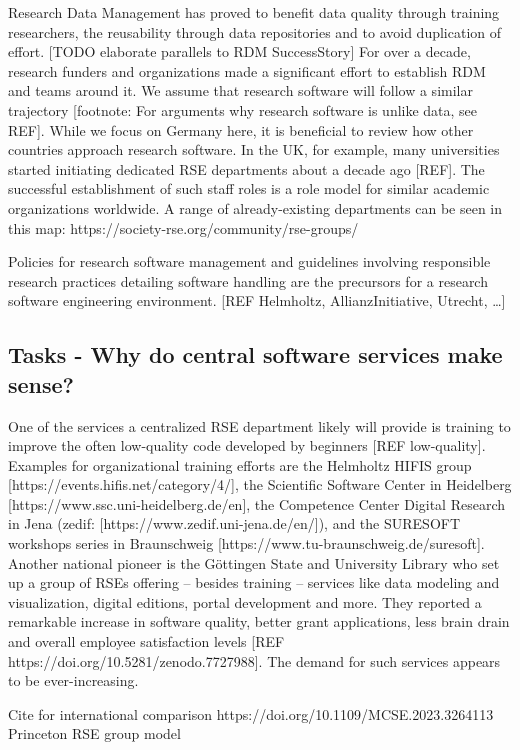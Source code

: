 \documentclass{article}
\begin{document}
Research Data Management has proved to benefit data quality through training researchers, the reusability through data repositories and to avoid duplication of effort.
[TODO elaborate parallels to RDM SuccessStory] For over a decade, research funders and organizations made a significant effort to establish RDM and teams around it.
We assume that research software will follow a similar trajectory [footnote: For arguments why research software is unlike data, see REF].
While we focus on Germany here, it is beneficial to review how other countries approach research software.
In the UK, for example, many universities started initiating dedicated RSE departments about a decade ago [REF].
The successful establishment of such staff roles is a role model for similar academic organizations worldwide.
A range of already-existing departments can be seen in this map: https://society-rse.org/community/rse-groups/ 

Policies for research software management and guidelines involving responsible research practices detailing software handling are the precursors for a research software engineering environment. [REF Helmholtz, AllianzInitiative, Utrecht, …]

\subsection{Tasks - Why do central software services make sense?}

One of the services a centralized RSE department likely will provide is training to improve the often low-quality code developed by beginners [REF low-quality].
Examples for organizational training efforts are the Helmholtz HIFIS group [https://events.hifis.net/category/4/], the Scientific Software Center in Heidelberg [https://www.ssc.uni-heidelberg.de/en], the Competence Center Digital Research in Jena (zedif: [https://www.zedif.uni-jena.de/en/]), and the SURESOFT workshops series in Braunschweig [https://www.tu-braunschweig.de/suresoft].
Another national pioneer is the Göttingen State and University Library who set up a group of RSEs offering – besides training – services like data modeling and visualization, digital editions, portal development and more. They reported a remarkable increase in software quality, better grant applications, less brain drain and overall employee satisfaction levels [REF https://doi.org/10.5281/zenodo.7727988].
The demand for such services appears to be ever-increasing.

Cite for international comparison https://doi.org/10.1109/MCSE.2023.3264113 Princeton RSE group model
\end{document}
